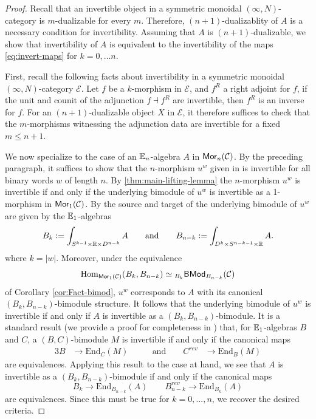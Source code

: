 \documentclass[10pt, reqno, twoside
, final
]{amsart}
\numberwithin{equation}{subsection}%
\theoremstyle{definition}
\theoremstyle{definition}
\theoremstyle{definition}
\theoremstyle{definition}
\theoremstyle{definition}
\theoremstyle{definition}
\theoremstyle{definition}
\theoremstyle{definition}
\theoremstyle{definition}
\theoremstyle{plain}
\theoremstyle{definition}
\theoremstyle{plain}
\theoremstyle{definition}
\theoremstyle{plain}
\theoremstyle{definition}
\theoremstyle{definition}
\theoremstyle{plain}
\theoremstyle{plain}
\theoremstyle{definition}
\theoremstyle{plain}
\theoremstyle{plain}
\theoremstyle{plain}
\begin{document}
\begin{proof}
Recall that an invertible object in a symmetric monoidal $(\infty,N)$-category is $m$-dualizable for every $m$. Therefore, $(n+1)$-dualizablity of $A$ is a necessary condition for invertibility. Assuming that $A$ is $(n+1)$-dualizable, we show that invertibility of $A$ is equivalent to the invertibility of the maps \eqref{eq:invert-maps} for  $k=0,\ldots n$.

First, recall the following facts about invertibility in a symmetric monoidal $(\infty,N)$-category $\mathcal{E}$. Let $f$ be a $k$-morphism in $\mathcal{E}$, and $f^R$ a right adjoint for $f$, if the unit and counit of the adjunction $f \dashv f^R$ are invertible, then $f^R$ is an inverse for $f$. For an $(n+1)$-dualizable object $X$ in $\mathcal{E}$, it therefore suffices to check that the $m$-morphisms witnessing the adjunction data are invertible for a fixed $m \leq n+1$.

We now specialize to the case of an $\mathbb{E}_n$-algebra $A$ in $\mathsf{Mor}_n(\mathcal{C})$. By the preceding paragraph, it suffices to show that the $n$-morphism $u^w$ given in  is invertible for all binary words $w$ of length $n$. By \cref{thm:main-lifting-lemma} the $n$-morphism $u^w$ is invertible if and only if the underlying bimodule of $u^w$ is invertible as a 1-morphism in $\mathsf{Mor}_{1}(\mathcal{C})$. By  the source and target of the underlying bimodule of $u^w$ are given by the $\mathbb{E}_1$-algebras
\begin{equation*}
    B_k := \int_{S^{k-1}\times \mathbb{R} \times D^{n-k}} A  \qquad \text{and} \qquad B_{n-k}:= \int_{D^k \times S^{n-k-1} \times \mathbb{R} } A .
\end{equation*}
where $k = |w|$. Moreover, under the equivalence
\begin{equation*}
    \mathrm{Hom}_{\mathsf{Mor}_{1}(\mathcal{C})}(B_k,B_{n-k}) \simeq {}_{B_k}\mathsf{BMod}_{B_{n-k}}(\mathcal{C})
\end{equation*}
of Corollary \ref{cor:Fact-bimod}, $u^w$ corresponds to $A$ with its canonical $(B_k,B_{n-k})$-bimodule structure. It follows that the underlying bimodule of $u^w$ is invertible if and only if $A$ is invertible as a $(B_k,B_{n-k})$-bimodule. It is a standard result (we provide a proof for completeness in ) that, for $\mathbb{E}_1$-algebras $B$ and $C$, a $(B,C)$-bimodule $M$ is invertible if and only if the canonical maps
\begin{alignat*}{3}
    B &\longrightarrow \mathrm{End}_{C}(M) \qquad &\text{and} \qquad  C^{rev} &\longrightarrow  \mathrm{End}_{B}(M) 
\end{alignat*}
are equivalences. Applying this result to the case at hand, we see that $A$ is invertible as a $(B_k,B_{n-k})$-bimodule if and only if the canonical maps
\begin{equation*}
    B_k \longrightarrow \mathrm{End}_{B_{n-k}}(A) \qquad B_{n-k}^{rev} \longrightarrow \mathrm{End}_{B_{k}}(A)
\end{equation*}
are equivalences. Since this must be true for $k=0,...,n$, we recover the desired criteria.
\end{proof}
\end{document}
